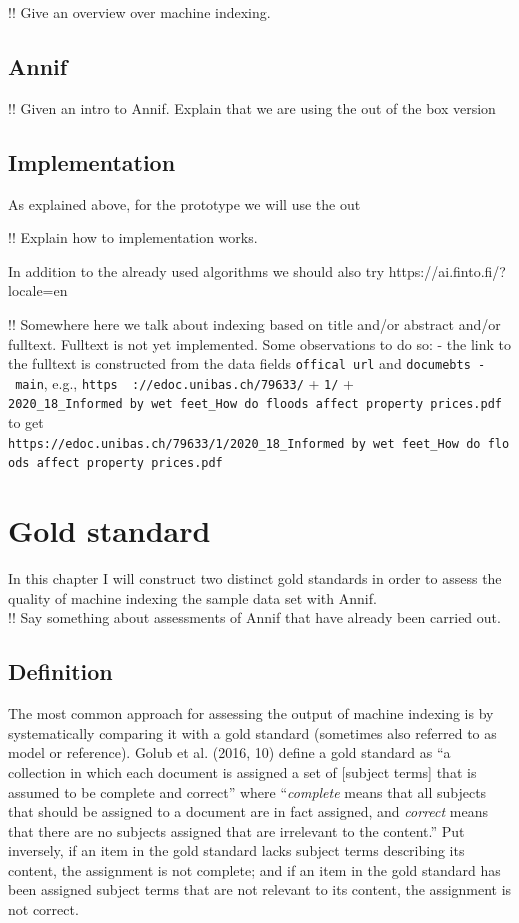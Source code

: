!! Give an overview over machine indexing.

\hypertarget{annif}{%
\subsection{Annif}\label{annif}}

!! Given an intro to Annif. Explain that we are using the out of the box
version

\hypertarget{implementation}{%
\subsection{Implementation}\label{implementation}}

As explained above, for the prototype we will use the out

!! Explain how to implementation works.

In addition to the already used algorithms we should also try
https://ai.finto.fi/?locale=en

!! Somewhere here we talk about indexing based on title and/or abstract
and/or fulltext. Fulltext is not yet implemented. Some observations to
do so: - the link to the fulltext is constructed from the data fields
\texttt{offical\ url} and \texttt{documebts\ -\ main}, e.g.,
\texttt{https\ \ ://edoc.unibas.ch/79633/} + \texttt{1/} +
\texttt{2020\_18\_Informed\ by\ wet\ feet\_How\ do\ floods\ affect\ property\ prices.pdf}
to get
\texttt{https://edoc.unibas.ch/79633/1/2020\_18\_Informed\ by\ wet\ feet\_How\ do\ floods\ affect\ property\ prices.pdf}

\hypertarget{gold-standard}{%
\section{Gold standard}\label{gold-standard}}

In this chapter I will construct two distinct gold standards in order to
assess the quality of machine indexing the sample data set with Annif.\\
!! Say something about assessments of Annif that have already been
carried out.

\hypertarget{definition}{%
\subsection{Definition}\label{definition}}

The most common approach for assessing the output of machine indexing is
by systematically comparing it with a gold standard (sometimes also
referred to as model or reference). Golub et al. (2016, 10) define a
gold standard as ``a collection in which each document is assigned a set
of {[}subject terms{]} that is assumed to be complete and correct''
where ``\emph{complete} means that all subjects that should be assigned
to a document are in fact assigned, and \emph{correct} means that there
are no subjects assigned that are irrelevant to the content.'' Put
inversely, if an item in the gold standard lacks subject terms
describing its content, the assignment is not complete; and if an item
in the gold standard has been assigned subject terms that are not
relevant to its content, the assignment is not correct.

